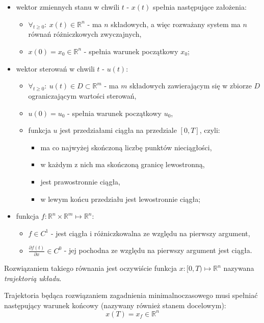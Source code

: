 \begin{itemize}
    \item wektor zmiennych stanu w chwili $t$ - $x(t)$ spełnia następujące założenia:
    \begin{itemize}
        \item $\forall_{t \geq 0}:~ x(t) \in \mathbb{R}^{n}$ - ma $n$ składowych, a więc rozważany system ma $n$ równań różniczkowych zwyczajnych,
        \item $x(0) = x_{0} \in \mathbb{R}^{n}$ - spełnia warunek początkowy $x_{0}$;
    \end{itemize}
    \item wektor sterowań w chwili $t$ - $u(t)$:
    \begin{itemize}
        \item $\forall_{t \geq 0}:~ u(t) \in D \subset \mathbb{R}^{m}$ - ma $m$ składowych zawierającym się w zbiorze $D$ ograniczającym wartości sterowań,
        \item $u(0) = u_{0}$ - spełnia warunek początkowy $u_{0}$,
        \item funkcja $u$ jest przedziałami ciągła na przedziale $[0, T]$, czyli:
        \begin{itemize}
            \item ma co najwyżej skończoną liczbę punktów nieciągłości,
            \item w każdym z nich ma skończoną granicę lewostronną,
            \item jest prawostronnie ciągła,
            \item w lewym końcu przedziału jest lewostronnie ciągła;
        \end{itemize}
    \end{itemize}
    \item funkcja $f: \mathbb{R}^{n} \times \mathbb{R}^{m} \longmapsto \mathbb{R}^{n}$:
    \begin{itemize}
        \item $f \in C^{1}$ - jest ciągła i różniczkowalna ze względu na pierwszy argument,
        \item $\frac{\partial f(t)}{\partial x} \in C^{0}$ - jej pochodna ze względu na pierwszy argument jest ciągła.
    \end{itemize}
\end{itemize}

Rozwiązaniem takiego równania jest oczywiście funkcja $x: [0, T) \longmapsto \mathbb{R}^{n}$ nazywana \emph{trajektorią układu}.

Trajektoria będąca rozwiązaniem zagadnienia minimalnoczasowego musi spełniać następujący warunek końcowy (nazywany również stanem docelowym):
\begin{equation}\label{eq:final_term}
    x(T) = x_{f} \in \mathbb{R}^{n}
\end{equation}

